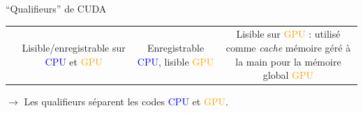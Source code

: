 \documentclass[handout,francais]{beamer}
\begin{document}
\begin{frame}{``Qualifieurs'' de CUDA}
{\begin{tabular}{c|ccc}
    & \begin{minipage}{25mm}
      Lisible/enregistrable sur \textcolor{blue}{CPU} et \textcolor{orange}{GPU}
    \end{minipage} &
    \begin{minipage}{25mm}
      Enregistrable \textcolor{blue}{CPU}, lisible \textcolor{orange}{GPU}
    \end{minipage} &
    \begin{minipage}{25mm}
      Lisible sur \textcolor{orange}{GPU} : utilisé comme \textsl{cache} mémoire géré à la main
      pour la mémoire global \textcolor{orange}{GPU}
    \end{minipage}
  \end{tabular}
}

$\rightarrow$ Les qualifieurs séparent les codes \textcolor{blue}{CPU} et \textcolor{orange}{GPU}.
\end{frame}
\end{document}
